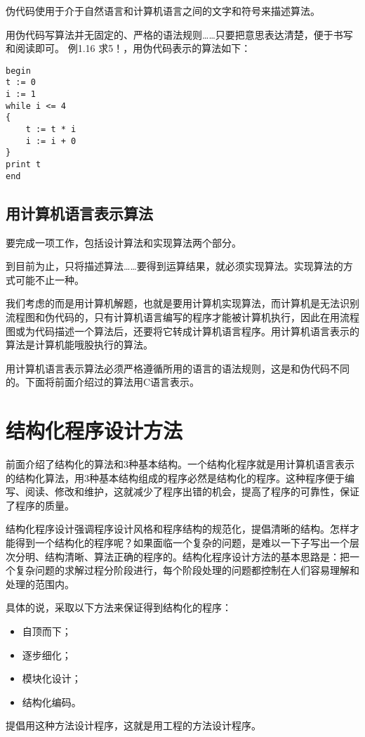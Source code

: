 伪代码使用于介于自然语言和计算机语言之间的文字和符号来描述算法。

用伪代码写算法并无固定的、严格的语法规则……只要把意思表达清楚，便于书写和阅读即可。
例1.16 求5！，用伪代码表示的算法如下：

\begin{lstlisting}
begin
t := 0
i := 1
while i <= 4
{
	t := t * i
	i := i + 0
}
print t
end
\end{lstlisting}

\subsection{用计算机语言表示算法}
要完成一项工作，包括设计算法和实现算法两个部分。

到目前为止，只将描述算法……要得到运算结果，就必须实现算法。实现算法的方式可能不止一种。

我们考虑的而是用计算机解题，也就是要用计算机实现算法，而计算机是无法识别流程图和伪代码的，只有计算机语言编写的程序才能被计算机执行，因此在用流程图或为代码描述一个算法后，还要将它转成计算机语言程序。用计算机语言表示的算法是计算机能哦股执行的算法。

用计算机语言表示算法必须严格遵循所用的语言的语法规则，这是和伪代码不同的。下面将前面介绍过的算法用C语言表示。
\section{结构化程序设计方法}
前面介绍了结构化的算法和3种基本结构。一个结构化程序就是用计算机语言表示的结构化算法，用3种基本结构组成的程序必然是结构化的程序。这种程序便于编写、阅读、修改和维护，这就减少了程序出错的机会，提高了程序的可靠性，保证了程序的质量。

结构化程序设计强调程序设计风格和程序结构的规范化，提倡清晰的结构。怎样才能得到一个结构化的程序呢？如果面临一个复杂的问题，是难以一下子写出一个层次分明、结构清晰、算法正确的程序的。结构化程序设计方法的基本思路是：把一个复杂问题的求解过程分阶段进行，每个阶段处理的问题都控制在人们容易理解和处理的范围内。

具体的说，采取以下方法来保证得到结构化的程序：
\begin{itemize}
	\item 自顶而下；
	\item 逐步细化；
	\item 模块化设计；
	\item 结构化编码。
\end{itemize}

提倡用这种方法设计程序，这就是用工程的方法设计程序。

